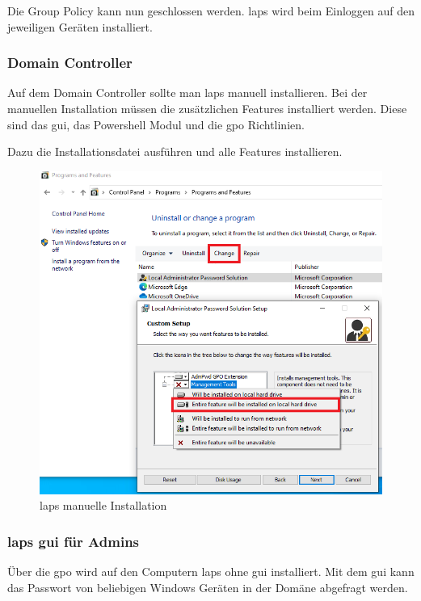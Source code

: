 Die Group Policy kann nun geschlossen werden.
\acrshort{laps} wird beim Einloggen auf den jeweiligen Geräten installiert.

\subsubsection{Domain Controller}
Auf dem Domain Controller sollte man \acrshort{laps} manuell installieren.
Bei der manuellen Installation müssen die zusätzlichen Features installiert werden.
Diese sind das \acrshort{gui}, das Powershell Modul und die \acrshort{gpo} Richtlinien.

Dazu die Installationsdatei ausführen und alle Features installieren.
\begin{figure}[H]
    \centering
    \includegraphics[width=0.7\linewidth]{../img/LAPS/laps-ui-install-2.png}
    \caption{\acrshort{laps} manuelle Installation}
\end{figure}


\subsubsection{\acrshort{laps} \acrshort{gui} für Admins}\label{subsubsec:Laps-Gui}
Über die \acrshort{gpo} wird auf den Computern \acrshort{laps} ohne \acrshort{gui} installiert.
Mit dem \acrshort{gui} kann das Passwort von beliebigen Windows Geräten in der Domäne abgefragt werden.\\

